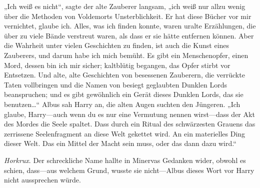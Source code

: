 „Ich weiß es nicht“, sagte der alte Zauberer langsam, „ich weiß nur allzu wenig über die Methoden von Voldemorts Unsterblichkeit. Er hat diese Bücher vor mir vernichtet, glaube ich. Alles, was ich finden konnte, waren uralte Erzählungen, die über zu viele Bände verstreut waren, als dass er sie hätte entfernen können. Aber die Wahrheit unter vielen Geschichten zu finden, ist auch die Kunst eines Zauberers, und darum habe ich mich bemüht. Es gibt ein Menschenopfer, einen Mord, dessen bin ich mir sicher; kaltblütig begangen, das Opfer stirbt vor Entsetzen. Und alte, alte Geschichten von besessenen Zauberern, die verrückte Taten vollbringen und die Namen von besiegt geglaubten Dunklen Lords beanspruchen; und es gibt gewöhnlich ein Gerät dieses Dunklen Lords, das sie benutzen…“
Albus sah Harry an, die alten Augen suchten den Jüngeren.
„Ich glaube, Harry—auch wenn du es nur eine Vermutung nennen wirst—dass der Akt des Mordes die Seele spaltet. Dass durch ein Ritual des schwärzesten Grauens das zerrissene Seelenfragment an diese Welt gekettet wird. An ein materielles Ding dieser Welt. Das ein Mittel der Macht sein muss, oder das dann dazu wird.“

\emph{Horkrux}. Der schreckliche Name hallte in Minervas Gedanken wider, obwohl es schien, dass—aus welchem Grund, wusste sie nicht—Albus dieses Wort vor Harry nicht aussprechen würde.

